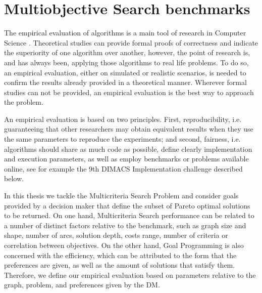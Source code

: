 \section{Multiobjective Search benchmarks}
\label{chapMultiObjTestBeds:sec:Antecedents}

The empirical evaluation of algorithms is a main tool of research in Computer Science \citep{johnson2002}. Theoretical studies can provide formal proofs of correctness and indicate the superiority of one algorithm over another, however, the point of research is, and has always been, applying those algorithms to real life problems. To do so, an empirical evaluation, either on simulated or realistic scenarios, is needed to confirm the results already provided in a theoretical manner. Wherever formal studies can not be provided, an empirical evaluation is the best way to approach the problem.

An empirical evaluation is based on two principles. First, reproducibility, i.e. guaranteeing that other researchers may obtain equivalent results when they use the same parameters to reproduce the experiments; and second, fairness, i.e. algorithms should share as much code as possible, define clearly implementation and execution parameters, as well as employ benchmarks or problems available online, see for example the 9th DIMACS Implementation challenge described below.

In this thesis we tackle the Multicriteria Search Problem and consider goals provided by a decision maker that define the subset of Pareto optimal solutions to be returned. On one hand, Multicriteria Search performance can be related to a number of distinct factors relative to the benchmark, such as graph size and shape, number of arcs, solution depth, costs range, number of criteria or correlation between objectives. On the other hand, Goal Programming is also concerned with the efficiency, which can be attributed to the form that the preferences are given, as well as the amount of solutions that satisfy them.
Therefore, we define our empirical evaluation based on parameters relative to the graph, problem, and preferences given by the DM. 

